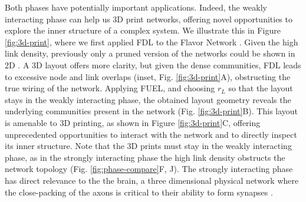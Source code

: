 \documentclass[nofootinbib,preprint,floatfix,titlepage,superscriptaddress]{revtex4} %
\begin{document}
Both phases have potentially important applications. 
Indeed, the weakly interacting phase can help us 3D print networks, offering novel opportunities to explore the inner structure of a complex system. 
We illustrate this in Figure \ref{fig:3d-print}, where we first applied FDL to the Flavor Network \cite{ahn2011flavor}.
Given the high link density, previously only a pruned version of the networks could be shown in 2D \cite{ahn2011flavor}. 
A 3D layout offers more clarity, but %
given the dense communities, FDL leads to excessive node and link overlaps (inset, Fig. \ref{fig:3d-print}A), obstructing the true wiring of the network. 
Applying FUEL, and choosing $r_L$ so that the layout stays in the weakly interacting phase, the obtained layout geometry reveals the underlying  communities present in the network (Fig. \ref{fig:3d-print}B). 
This layout is amenable to 3D printing, as shown in Figure \ref{fig:3d-print}C, offering unprecedented opportunities to interact with the network and to directly inspect its inner structure.
Note that the 3D prints must stay in the weakly interacting phase, as in the strongly interacting phase the high link density obstructs the network topology (Fig. \ref{fig:phase-compare}F, J).
The strongly interacting phase has direct relevance to the the brain, a three dimensional physical network where the close-packing of the axons is critical to their ability to form synapses \cite{stepanyants2002geometry,rivera2011wiring}. 
\end{document}
